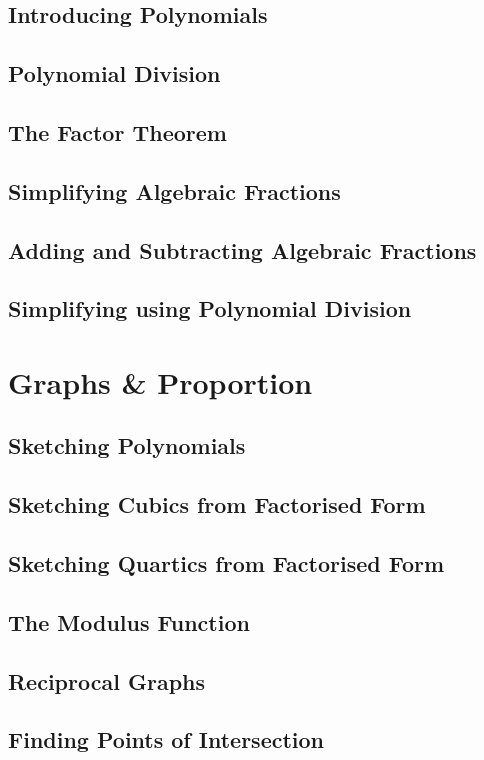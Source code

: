 \documentclass[../maths.tex]{subfiles}
\begin{document}
\subsection*{Introducing Polynomials}
\subsection*{Polynomial Division}
\subsection*{The Factor Theorem}
\subsection*{Simplifying Algebraic Fractions}
\subsection*{Adding and Subtracting Algebraic Fractions}
\subsection*{Simplifying using Polynomial Division}
\section{Graphs \& Proportion}
\subsection*{Sketching Polynomials}
\subsection*{Sketching Cubics from Factorised Form}
\subsection*{Sketching Quartics from Factorised Form}
\subsection*{The Modulus Function}
\subsection*{Reciprocal Graphs}
\subsection*{Finding Points of Intersection}
\end{document}
